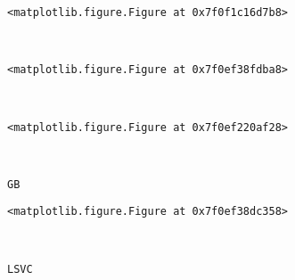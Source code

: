 \documentclass[11pt]{article}
\begin{document}
    
    \begin{verbatim}
<matplotlib.figure.Figure at 0x7f0f1c16d7b8>
    \end{verbatim}

    
    \begin{center}
    \end{center}
    { \hspace*{\fill} \\}
    
    
    \begin{verbatim}
<matplotlib.figure.Figure at 0x7f0ef38fdba8>
    \end{verbatim}

    
    \begin{center}
    \end{center}
    { \hspace*{\fill} \\}
    
    
    \begin{verbatim}
<matplotlib.figure.Figure at 0x7f0ef220af28>
    \end{verbatim}

    
    \begin{center}
    \end{center}
    { \hspace*{\fill} \\}
    
    \begin{Verbatim}[commandchars=\\\{\}]
GB

    \end{Verbatim}

    
    \begin{verbatim}
<matplotlib.figure.Figure at 0x7f0ef38dc358>
    \end{verbatim}

    
    \begin{center}
    \end{center}
    { \hspace*{\fill} \\}
    
    \begin{Verbatim}[commandchars=\\\{\}]
LSVC

    \end{Verbatim}
\end{document}
